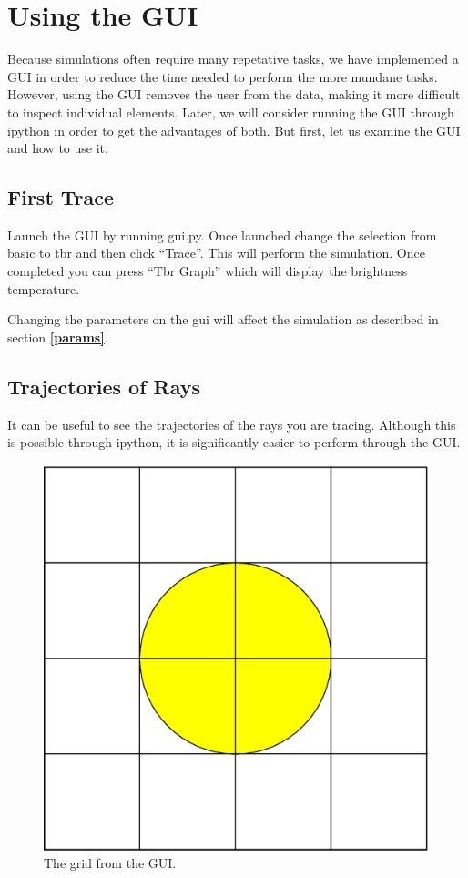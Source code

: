 \documentclass[12pt]{article}
\begin{document}
\section{Using the GUI}
Because simulations often require many repetative tasks, we have
implemented a GUI in order to reduce the time needed to perform the
more mundane tasks. However, using the GUI removes the user from
the data, making it more difficult to inspect individual elements. 
Later, we will consider running the GUI through ipython in
order to get the advantages of both. But first, let us examine the GUI
and how to use it.

\subsection{First Trace}
Launch the GUI by running gui.py. Once launched change the selection
from basic to tbr and then click ``Trace''. This will perform the
simulation. Once completed you can press ``Tbr Graph'' which will
display the brightness temperature.

Changing the parameters on the gui will affect the simulation as
described in section {\bf \autoref{params}}.

\subsection{Trajectories of Rays}
It can be useful to see the trajectories of the rays you are
tracing. Although this is possible through ipython, it is
significantly easier to perform through the GUI.

\begin{figure}[ht]
\begin{center}
\includegraphics[scale=.5]{trajectory}
\end{center}
\caption{The grid from the GUI.}
\end{figure}
\end{document}
